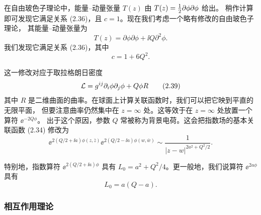 在自由玻色子理论中，能量–动量张量 $T(z)$ 由 $T(z)=\tfrac{1}{2}\partial\phi\partial\phi$ 给出。
稍作计算即可发现它满足关系 (2.36)，且 $c=1$。现在我们考虑一个略有修改的自由玻色子理论，
其能量–动量张量为
\begin{equation}
  T(z) = \partial\phi\partial\phi + \ii Q\partial^2\phi.
  \tag{2.37}
\end{equation}
我们发现它满足关系 (2.36)，其中
\begin{equation}
  c = 1 + 6Q^2.
  \tag{2.38}
\end{equation}


这一修改对应于取拉格朗日密度
\begin{equation}
  \mathcal{L} = g^{ij}\partial_i\phi\partial_j\phi + Q\phi R
  \tag{2.39}
\end{equation}
其中 $R$ 是二维曲面的曲率。在球面上计算关联函数时，我们可以把它映到平直的无限平面，
但要注意曲率仍然集中在 $z=\infty$ 处。这等效于在 $z=\infty$ 处放置一个算符 $\ee^{-2Q\phi}$。
出于这个原因，参数 $Q$ 常被称为背景电荷。这会把指数场的基本关联函数 (2.34) 修改为
\begin{equation}
  \ee^{2(Q/2+\ii a)\phi(z,\bar z)}\ee^{2(Q/2-\ii a)\phi(w,\bar w)}
  \sim \frac{1}{|z-w|^{2a^2+Q^2/2}}.
  \tag{2.40}
\end{equation}

特别地，指数算符 $\ee^{2(Q/2+\ii a)\phi}$ 具有 $L_0=a^2+Q^2/4$。更一般地，我们说算符
$\ee^{2a\phi}$ 具有
\begin{equation}
  L_0 = a(Q-a).
  \tag{2.41}
\end{equation}


\subsubsection{相互作用理论}

